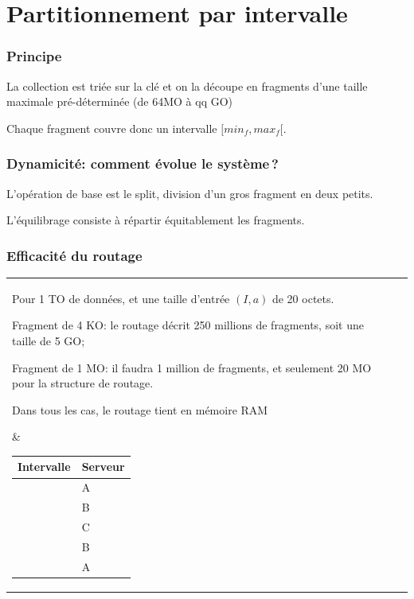 

\section{Partitionnement par intervalle}

\begin{frame}
\frametitle{Principe}

La collection est \alert{triée} sur la clé  et on la découpe en fragments d'une taille maximale pré-déterminée (de 64MO à qq GO)

\vfill

 Chaque fragment couvre donc un intervalle $[min_f, max_f[$.
 
\vfill
 
\end{frame}


\begin{frame}
\frametitle{Dynamicité: comment évolue le système\,?}

L'opération de base est le \alert{split}, division d'un gros fragment en deux petits.


\alert{L'équilibrage} consiste à répartir équitablement les fragments.

\end{frame}



\begin{frame}
\frametitle{Efficacité du routage}


\begin{tabular}{l|p{6cm}}
   \parbox{5cm}{
   
   Pour 1 TO de données, et une taille d'entrée  $(I, a)$ de 20 octets.

\begin{redbullet}
  \item Fragment de 4 KO:
    le routage décrit 250 millions de fragments, soit une taille de 5 GO;    
  \item Fragment de 1 MO: il faudra 1 million de fragments,
    et seulement 20 MO pour la structure de routage.
\end{redbullet}
Dans tous les  cas, le routage tient en mémoire RAM

   }  %
  & 
  \parbox{6cm}{
 
\begin{tabular}{r|l}
Intervalle  & Serveur\\
\hline
$]-\infty, a]$ & A  \\
$[a+1, b]$ & B  \\
$[b+1, c]$ & C  \\
$[c+1, d]$ & B  \\
$[d+1, \infty[$ & A  \\
\hline
\end{tabular}

}

\end{tabular}



 

\end{frame}


